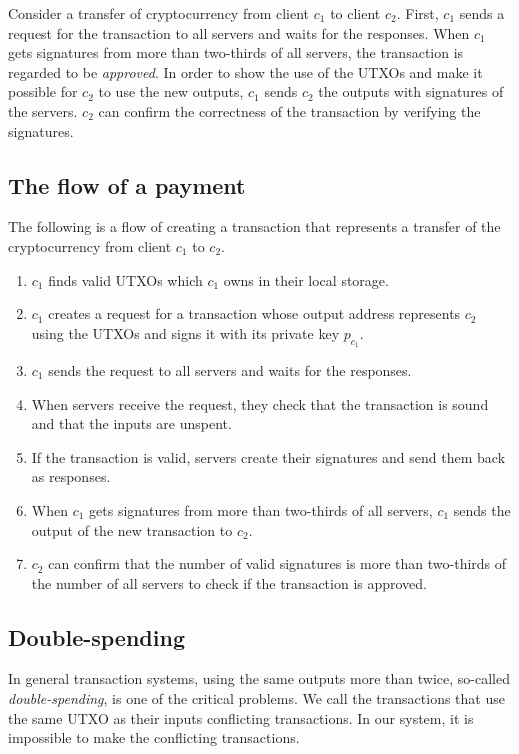\documentclass[a4paper, oneside]{discothesis}
\begin{document}
Consider a transfer of cryptocurrency from client $c_1$ to client $c_2$.
First, $c_1$ sends a request for the transaction to all servers and waits for the responses.
When $c_1$ gets signatures from more than two-thirds of all servers,
the transaction is regarded to be \emph{approved}.
In order to show the use of the UTXOs and make it possible for $c_2$ to use the new outputs,
$c_1$ sends $c_2$ the outputs with signatures of the servers.
$c_2$ can confirm the correctness of the transaction by verifying the signatures.

\subsection{The flow of a payment}
The following is a flow of creating a transaction
that represents a transfer of the cryptocurrency from client $c_1$ to $c_2$.

\begin{enumerate}
    \item $c_1$ finds valid UTXOs which $c_1$ owns in their local storage.
    \item $c_1$ creates a request for a transaction whose output address represents $c_2$ using the UTXOs and signs it with its private key $p_{c_1}$.
    \item $c_1$ sends the request to all servers and waits for the responses.
    \item When servers receive the request, they check that the transaction is sound
        and that the inputs are unspent.
    \item If the transaction is valid,
        servers create their signatures and send them back as responses.
    \item When $c_1$ gets signatures from more than two-thirds of all servers,
        $c_1$ sends the output of the new transaction to $c_2$.
    \item $c_2$ can confirm that the number of valid signatures is more than two-thirds
        of the number of all servers to check if the transaction is approved.
\end{enumerate}


\subsection{Double-spending}
\label{sub:double-spending}
In general transaction systems, using the same outputs more than twice,
so-called \emph{double-spending}, is one of the critical problems.
We call the transactions that use the same UTXO as their inputs conflicting transactions.
In our system, it is impossible to make the conflicting transactions.
\end{document}

